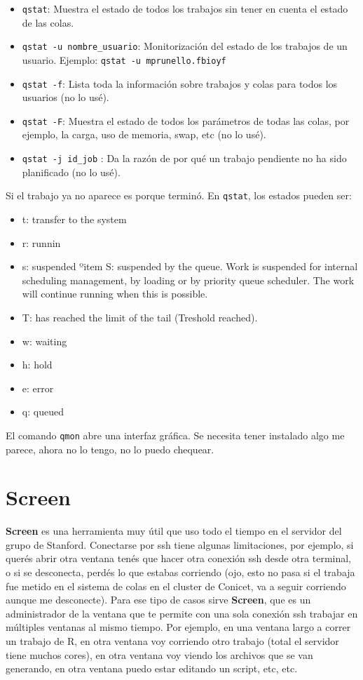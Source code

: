 \documentclass[paper=a4, fontsize=11pt]{scrartcl} %
\numberwithin{equation}{section} %
\numberwithin{figure}{section} %
\numberwithin{table}{section} %
\begin{document}
\begin{itemize}
	\item \texttt{qstat}: Muestra el estado de todos los trabajos sin tener en cuenta el estado de las colas.
	\item \texttt{qstat -u nombre\_usuario}: Monitorización del estado de los trabajos de un usuario. Ejemplo: \texttt{qstat -u mprunello.fbioyf}
	\item \texttt{qstat -f}: Lista toda la información sobre trabajos y colas para todos los usuarios (no lo usé).
	\item \texttt{qstat -F}: Muestra el estado de todos los parámetros de todas las colas, por ejemplo, la carga, uso de memoria, swap, etc (no lo usé).
	\item \texttt{qstat -j id\_job} : Da la razón de por qué un trabajo pendiente no ha sido planificado (no lo usé).
\end{itemize}

Si el trabajo ya no aparece es porque terminó. En \texttt{qstat}, los estados pueden ser:

\begin{itemize}
	\item t: transfer to the system
	\item r: runnin
	\item s: suspended
	ºitem S: suspended by the queue. Work is suspended for internal scheduling management, by loading or by priority queue scheduler. The work will continue running when this is possible.
	\item T: has reached the limit of the tail (Treshold reached).
	\item w: waiting
	\item h: hold
	\item e: error
	\item q: queued
\end{itemize}

El comando \texttt{qmon} abre una interfaz gráfica. Se necesita tener instalado algo me parece, ahora no lo tengo, no lo puedo chequear.

\section{Screen}

\textbf{Screen} es una herramienta muy útil que uso todo el tiempo en el servidor del grupo de Stanford. Conectarse por ssh tiene algunas limitaciones, por ejemplo, si querés abrir otra ventana tenés que hacer otra conexión ssh desde otra terminal, o si se desconecta, perdés lo que estabas corriendo (ojo, esto no pasa si el trabaja fue metido en el sistema de colas en el cluster de Conicet, va a seguir corriendo aunque me desconecte). Para ese tipo de casos sirve \textbf{Screen}, que es un administrador de la ventana que te permite con una sola conexión ssh trabajar en múltiples ventanas al mismo tiempo. Por ejemplo, en una ventana largo a correr un trabajo de R, en otra ventana voy corriendo otro trabajo (total el servidor tiene muchos cores), en otra ventana voy viendo los archivos que se van generando, en otra ventana puedo estar editando un script, etc, etc. \\
\end{document}
